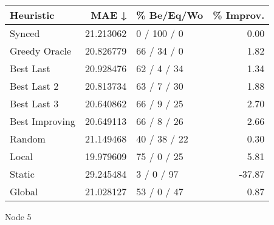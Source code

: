 \begin{tabular}{lrlr}
\toprule
      Heuristic &      MAE ↓ &    \% Be/Eq/Wo & \% Improv. \\
\midrule
         Synced &  21.213062 &   0 / 100 / 0 &      0.00 \\
  Greedy Oracle &  20.826779 &   66 / 34 / 0 &      1.82 \\
      Best Last &  20.928476 &   62 / 4 / 34 &      1.34 \\
    Best Last 2 &  20.813734 &   63 / 7 / 30 &      1.88 \\
    Best Last 3 &  20.640862 &   66 / 9 / 25 &      2.70 \\
 Best Improving &  20.649113 &   66 / 8 / 26 &      2.66 \\
         Random &  21.149468 &  40 / 38 / 22 &      0.30 \\
          Local &  19.979609 &   75 / 0 / 25 &      5.81 \\
         Static &  29.245484 &    3 / 0 / 97 &    -37.87 \\
         Global &  21.028127 &   53 / 0 / 47 &      0.87 \\
\bottomrule
\end{tabular}
\caption{Node 5}
\label{tab:non_lr005_le1_bs2_5}
